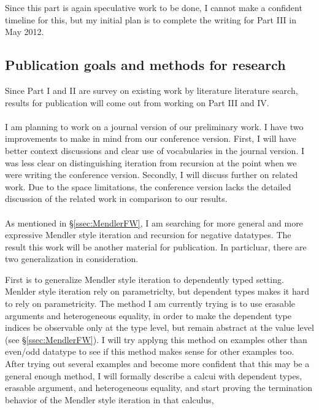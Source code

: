 Since this part is again speculative work to be done, I cannot make a confident
timeline for this, but my initial plan is to complete the writing for Part III
in May 2012.

\subsection{Publication goals and methods for research}
Since Part I and II are survey on existing work by literature literature search,
results for publication will come out from working on Part III and IV.

\paragraph{}
I am planning to work on a journal version of our preliminary work.
I have two improvements to make in mind from our conference version.
First, I will have better context discussions and clear use of vocabularies
in the journal version. I was less clear on distinguishing iteration from
recursion at the point when we were writing the conference version.
Secondly, I will discuss further on related work. Due to the space limitations,
the conference version lacks the detailed discussion of the related work
in comparison to our results.

\paragraph{}
As mentioned in \S\ref{ssec:MendlerFW}, I am searching for more general and
more expressive Mendler style iteration and recursion for negative datatypes.
The result this work will be another material for publication.
In particluar, there are two generalization in consideration.

First is to generalize Mendler style iteration to dependently typed setting.
Menlder style iteration rely on parametriclty, but dependent types makes it
hard to rely on parametricity. The method I am currently trying is to use
erasable arguments and heterogeneous equality, in order to make
the dependent type indices be observable only at the type level,
but remain abstract at the value level (see \S\ref{ssec:MendlerFW}).
I will try applyng this method on examples other than even/odd datatype
to see if this method makes sense for other examples too. After trying out
several examples and become more confident that this may be a general enough
method, I will formally describe a calcui with dependent types, erasable
argument, and heterogeneous equality, and start proving the termination
behavior of the Mendler style iteration in that calculus,

